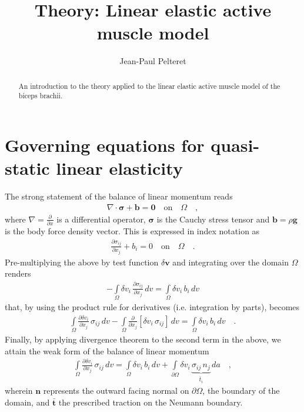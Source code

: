 \documentclass[]{scrartcl}
\title{Theory: Linear elastic active muscle model}
\author{Jean-Paul Pelteret}
\begin{document}
\maketitle

\begin{abstract}
An introduction to the theory applied to the linear elastic active muscle model of the biceps brachii.
\end{abstract}

\section{Governing equations for quasi-static linear elasticity}
The strong statement of the balance of linear momentum reads
\begin{gather}
\nabla \cdot \boldsymbol{\sigma} + \mathbf{b} 
  = \mathbf{0}
\quad \text{on} \quad \Omega \quad ,
\end{gather}
where $\nabla = \frac{\partial}{\partial x}$ is a differential operator,
$\boldsymbol{\sigma}$ is the Cauchy stress tensor and
$\mathbf{b} = \rho \mathbf{g}$ is the body force density vector.
This is expressed in index notation as
\begin{gather}
\frac{\partial \sigma_{ij}}{\partial x_{j}} + b_{i} 
  = 0
\quad \text{on} \quad \Omega \quad .
\end{gather}
Pre-multiplying the above by test function $\delta \mathbf{v}$ and integrating over the domain $\Omega$ renders
\begin{gather}
- \int\limits_{\Omega} \delta v_{i} \,  \frac{\partial \sigma_{ij}}{\partial x_{j}} \, dv
  = \int\limits_{\Omega} \delta v_{i} \, b_{i} \, dv
\end{gather}
that, by using the product rule for derivatives (i.e. integration by parts), becomes
\begin{gather}
\int\limits_{\Omega} \frac{\partial \delta v_{i}}{\partial x_{j}} \, \sigma_{ij} \, dv
- \int\limits_{\Omega} \frac{\partial}{\partial x_{j}} \left[ \delta v_{i} \, \sigma_{ij} \right] \, dv
  = \int\limits_{\Omega} \delta v_{i} \, b_{i} \, dv
\quad .
\end{gather}
Finally, by applying divergence theorem to the second term in the above, we attain the weak form of the balance of linear momentum
\begin{gather}
\int\limits_{\Omega} \frac{\partial \delta v_{i}}{\partial x_{j}} \, \sigma_{ij} \, dv
  = \int\limits_{\Omega} \delta v_{i} \, b_{i} \, dv
  + \int\limits_{\partial\Omega} \delta v_{i} \, \underbrace{\sigma_{ij} \, n_{j}}_{\bar{t}_{i}} \, da
\quad ,
\label{equ: Weak form of the balance of linear momentum}
\end{gather}
wherein $\mathbf{n}$ represents the outward facing normal on $\partial\Omega$, the boundary of the domain, and $\bar{\mathbf{t}}$ the prescribed traction on the Neumann boundary.
\end{document}
